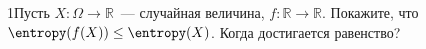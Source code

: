 1Пусть $X\colon \Omega \to \mathbb{R}$~--- случайная величина, $f\colon \mathbb{R} \to
\mathbb{R}$. Покажите, что $\entropy(f(X)) \le \entropy(X)$. Когда достигается равенство?
